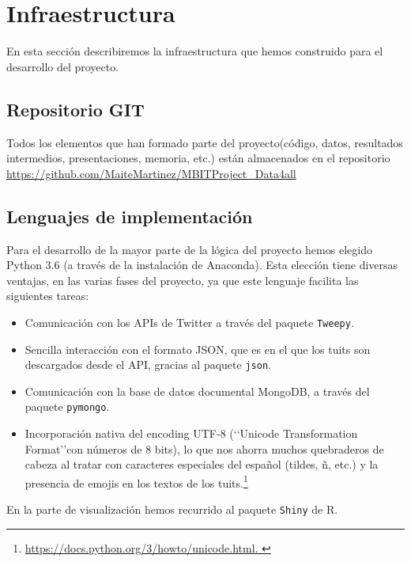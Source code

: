 
\chapter{Infraestructura}
En esta sección describiremos la infraestructura que hemos construido para el desarrollo del proyecto.
\section{Repositorio GIT}
\label{sect:repositorio}
Todos los elementos que han formado parte del proyecto(código, datos, resultados intermedios, presentaciones,
memoria, etc.) están almacenados en el 
repositorio \url{https://github.com/MaiteMartinez/MBITProject_Data4all}


\section{Lenguajes de implementación}

Para el desarrollo de la mayor parte de la lógica del proyecto hemos elegido Python 3.6 (a través de la
instalación de Anaconda). Esta elección tiene diversas ventajas, en las varias fases del proyecto, ya
que este lenguaje facilita las siguientes tareas:
\begin{itemize}
\item Comunicación con los APIs de Twitter a través del paquete {\tt Tweepy}.
\item Sencilla interacción con el formato JSON, que es en el que los tuits son descargados desde el API, gracias al paquete {\tt json}.
\item  Comunicación con la base de datos documental MongoDB, a través del paquete {\tt pymongo}.
\item Incorporación nativa del encoding UTF-8 (\lq\lq Unicode Transformation Format\rq\rq con números de 8 bits), 
lo que nos ahorra muchos quebraderos de cabeza al tratar con caracteres especiales del español (tildes, ñ, etc.)
y la presencia de emojis en los textos de los tuits.\footnote{\url{https://docs.python.org/3/howto/unicode.html. }}
\end{itemize}

En la parte de visualización hemos recurrido al paquete {\tt Shiny} de R.

